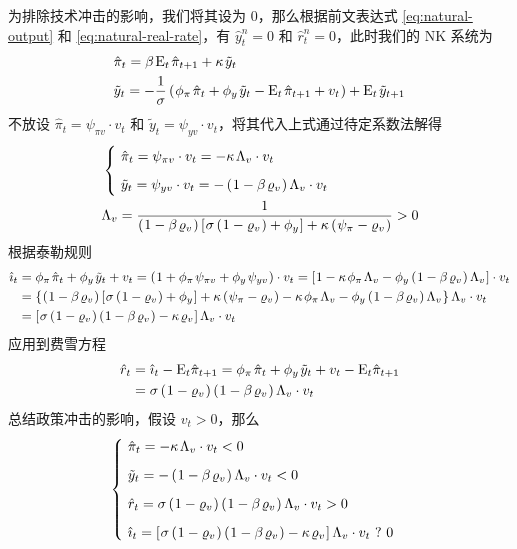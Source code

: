 为排除技术冲击的影响，我们将其设为 0，那么根据前文表达式 \ref{eq:natural-output} 和 \ref{eq:natural-real-rate}，有 \(\hat y^n_t=0\) 和 \(\hat r^n_t=0\)，此时我们的 NK 系统为
\begin{align*}
    &\hat\pi_t=\beta\,\meant\,\hat\pi\nt+\kappa\,\tilde y_t\\
    &\tilde y_t=-\dfrac1\sigma\bka{\phi_\pi\,\hat\pi_t+\phi_y\,\tilde y_t-\meant\,\hat\pi\nt+v_t}+\meant\,\tilde y\nt
\end{align*}
不放设 \(\hat\pi_t=\psi_{\pi v}\cdot v_t\) 和 \(\tilde y_t=\psi_{yv}\cdot v_t\)，将其代入上式通过待定系数法解得
\begin{align*}
    &\begin{cases}
        \ \hat\pi_t=\psi_{\pi v}\cdot v_t=-\kappa\,\Lambda_v\cdot v_t\\[6pt]
        \ \tilde y_t=\psi_{yv}\cdot v_t=-\bka{1-\beta\,\varrho_v}\Lambda_v\cdot v_t
    \end{cases}\\
    &\Lambda_v=\dfrac1{\bka{1-\beta\,\varrho_v}\bks{\sigma\bka{1-\varrho_v}+\phi_y}+\kappa\bka{\psi_\pi-\varrho_v}}>0
\end{align*}
根据泰勒规则
\begin{align*}
    \hat\imath_t&=\phi_\pi\,\hat\pi_t+\phi_y\,\tilde y_t+v_t=\bka{1+\phi_\pi\,\psi_{\pi v}+\phi_y\,\psi_{yv}}\cdot v_t=\bks{1-\kappa\,\phi_\pi\,\Lambda_v-\phi_y\bka{1-\beta\,\varrho_v}\Lambda_v}\cdot v_t\\
    &=\bkd{\bka{1-\beta\,\varrho_v}\bks{\sigma\bka{1-\varrho_v}+\phi_y}+\kappa\bka{\psi_\pi-\varrho_v}-\kappa\,\phi_\pi\,\Lambda_v-\phi_y\bka{1-\beta\,\varrho_v}\Lambda_v}\Lambda_v\cdot v_t\\
    &=\bks{\sigma\bka{1-\varrho_v}\bka{1-\beta\,\varrho_v}-\kappa\,\varrho_v}\Lambda_v\cdot v_t
\end{align*}
应用到费雪方程
\begin{align*}
    \hat r_t&=\hat\imath_t-\meant\hat\pi\nt=\phi_\pi\,\hat\pi_t+\phi_y\,\tilde y_t+v_t-\meant\hat\pi\nt\\
    &=\sigma\bka{1-\varrho_v}\bka{1-\beta\,\varrho_v}\Lambda_v\cdot v_t
\end{align*}
总结政策冲击的影响，假设 \(v_t>0\)，那么
\begin{equation*}
    \begin{cases}
        \ \hat\pi_t=-\kappa\,\Lambda_v\cdot v_t<0\\[6pt]
        \ \tilde y_t=-\bka{1-\beta\,\varrho_v}\Lambda_v\cdot v_t<0\\[6pt]
        \ \hat r_t=\sigma\bka{1-\varrho_v}\bka{1-\beta\,\varrho_v}\Lambda_v\cdot v_t>0\\[6pt]
        \ \hat\imath_t=\bks{\sigma\bka{1-\varrho_v}\bka{1-\beta\,\varrho_v}-\kappa\,\varrho_v}\Lambda_v\cdot v_t \ ? \ 0
    \end{cases}
\end{equation*}

